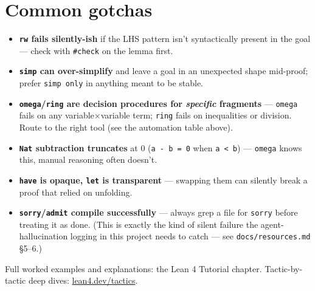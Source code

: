 \section{Common gotchas}

\begin{itemize}
  \item \textbf{\texttt{rw} fails silently-ish} if the LHS pattern isn't syntactically present in the goal --- check with \texttt{\#check} on the lemma first.
  \item \textbf{\texttt{simp} can over-simplify} and leave a goal in an unexpected shape mid-proof; prefer \texttt{simp only} in anything meant to be stable.
  \item \textbf{\texttt{omega}/\texttt{ring} are decision procedures for \emph{specific} fragments} --- \texttt{omega} fails on any variable×variable term; \texttt{ring} fails on inequalities or division. Route to the right tool (see the automation table above).
  \item \textbf{\texttt{Nat} subtraction truncates} at 0 (\texttt{a - b = 0} when \texttt{a < b}) --- \texttt{omega} knows this, manual reasoning often doesn't.
  \item \textbf{\texttt{have} is opaque, \texttt{let} is transparent} --- swapping them can silently break a proof that relied on unfolding.
  \item \textbf{\texttt{sorry}/\texttt{admit} compile successfully} --- always grep a file for \texttt{sorry} before treating it as done. (This is exactly the kind of silent failure the agent-hallucination logging in this project needs to catch --- see \texttt{docs/resources.md} \S5--6.)
\end{itemize}

Full worked examples and explanations: the Lean 4 Tutorial chapter. Tactic-by-tactic deep dives: \href{https://lean4.dev/tactics}{lean4.dev/tactics}.

